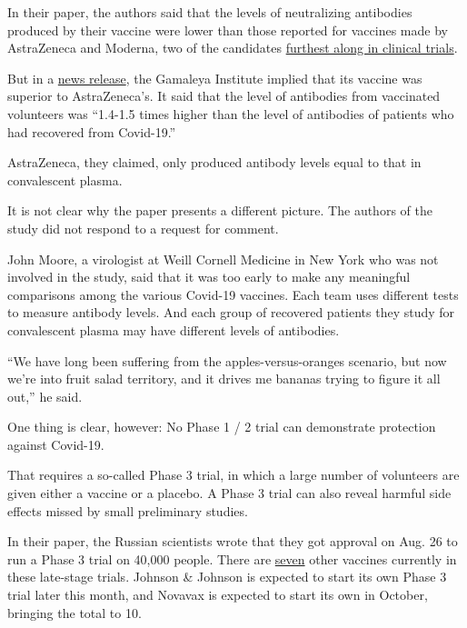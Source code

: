 In their paper, the authors said that the levels of neutralizing
antibodies produced by their vaccine were lower than those reported for
vaccines made by AstraZeneca and Moderna, two of the candidates
\href{https://www.nytimes3xbfgragh.onion/interactive/2020/science/coronavirus-vaccine-tracker.html}{furthest
along in clinical trials}.

But in a
\href{https://sputnikvaccine.com/newsroom/pressreleases/rdif-and-the-gamaleya-national-research-center-of-epidemiology-and-microbiology-announce-the-publica/}{news
release}, the Gamaleya Institute implied that its vaccine was superior
to AstraZeneca's. It said that the level of antibodies from vaccinated
volunteers was ``1.4-1.5 times higher than the level of antibodies of
patients who had recovered from Covid-19.''

AstraZeneca, they claimed, only produced antibody levels equal to that
in convalescent plasma.

It is not clear why the paper presents a different picture. The authors
of the study did not respond to a request for comment.

John Moore, a virologist at Weill Cornell Medicine in New York who was
not involved in the study, said that it was too early to make any
meaningful comparisons among the various Covid-19 vaccines. Each team
uses different tests to measure antibody levels. And each group of
recovered patients they study for convalescent plasma may have different
levels of antibodies.

``We have long been suffering from the apples-versus-oranges scenario,
but now we're into fruit salad territory, and it drives me bananas
trying to figure it all out,'' he said.

One thing is clear, however: No Phase 1 / 2 trial can demonstrate
protection against Covid-19.

That requires a so-called Phase 3 trial, in which a large number of
volunteers are given either a vaccine or a placebo. A Phase 3 trial can
also reveal harmful side effects missed by small preliminary studies.

In their paper, the Russian scientists wrote that they got approval on
Aug. 26 to run a Phase 3 trial on 40,000 people. There are
\href{https://www.nytimes3xbfgragh.onion/interactive/2020/science/coronavirus-vaccine-tracker.html}{seven}
other vaccines currently in these late-stage trials. Johnson \& Johnson
is expected to start its own Phase 3 trial later this month, and Novavax
is expected to start its own in October, bringing the total to 10.

